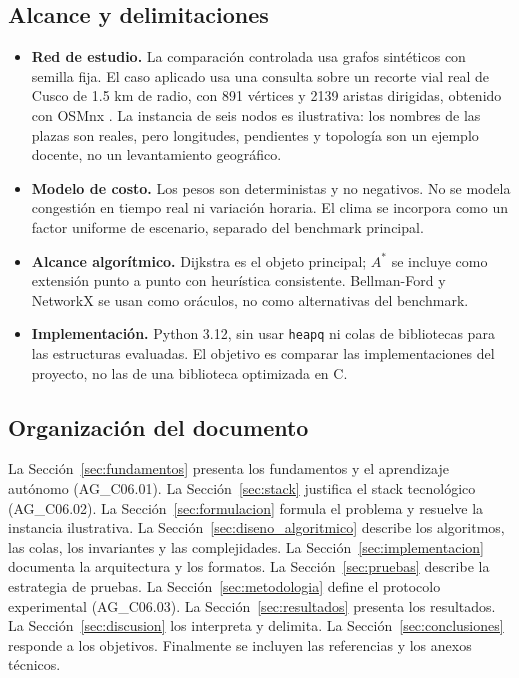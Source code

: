 \subsection{Alcance y delimitaciones}
\begin{itemize}
    \item \textbf{Red de estudio.} La comparación controlada usa grafos sintéticos con semilla fija. El caso aplicado usa una consulta sobre un recorte vial real de Cusco de 1.5 km de radio, con 891 vértices y 2139 aristas dirigidas, obtenido con OSMnx \parencite{boeing2017osmnx}. La instancia de seis nodos es ilustrativa: los nombres de las plazas son reales, pero longitudes, pendientes y topología son un ejemplo docente, no un levantamiento geográfico.
    \item \textbf{Modelo de costo.} Los pesos son deterministas y no negativos. No se modela congestión en tiempo real ni variación horaria. El clima se incorpora como un factor uniforme de escenario, separado del benchmark principal.
    \item \textbf{Alcance algorítmico.} Dijkstra es el objeto principal; $A^*$ se incluye como extensión punto a punto con heurística consistente. Bellman-Ford y NetworkX se usan como oráculos, no como alternativas del benchmark.
    \item \textbf{Implementación.} Python 3.12, sin usar \texttt{heapq} ni colas de bibliotecas para las estructuras evaluadas. El objetivo es comparar las implementaciones del proyecto, no las de una biblioteca optimizada en C.
\end{itemize}

\subsection{Organización del documento}
La Sección~\ref{sec:fundamentos} presenta los fundamentos y el aprendizaje autónomo (AG\_C06.01). La Sección~\ref{sec:stack} justifica el stack tecnológico (AG\_C06.02). La Sección~\ref{sec:formulacion} formula el problema y resuelve la instancia ilustrativa. La Sección~\ref{sec:diseno_algoritmico} describe los algoritmos, las colas, los invariantes y las complejidades. La Sección~\ref{sec:implementacion} documenta la arquitectura y los formatos. La Sección~\ref{sec:pruebas} describe la estrategia de pruebas. La Sección~\ref{sec:metodologia} define el protocolo experimental (AG\_C06.03). La Sección~\ref{sec:resultados} presenta los resultados. La Sección~\ref{sec:discusion} los interpreta y delimita. La Sección~\ref{sec:conclusiones} responde a los objetivos. Finalmente se incluyen las referencias y los anexos técnicos.

